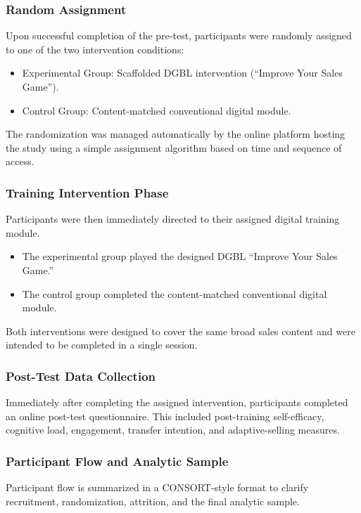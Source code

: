 \documentclass[12pt]{report}
\begin{document}
\subsubsection{Random Assignment}
Upon successful completion of the pre-test, participants were randomly assigned to one of the two intervention conditions:

\begin{itemize}[leftmargin=1.2cm]
    \item Experimental Group: Scaffolded DGBL intervention (``Improve Your Sales Game'').
    \item Control Group: Content-matched conventional digital module.
\end{itemize}

The randomization was managed automatically by the online platform hosting the study using a simple assignment algorithm based on time and sequence of access.

\subsubsection{Training Intervention Phase}
Participants were then immediately directed to their assigned digital training module.

\begin{itemize}[leftmargin=1.2cm]
    \item The experimental group played the designed DGBL ``Improve Your Sales Game.''
    \item The control group completed the content-matched conventional digital module.
\end{itemize}

Both interventions were designed to cover the same broad sales content and were intended to be completed in a single session.

\subsubsection{Post-Test Data Collection}
Immediately after completing the assigned intervention, participants completed an online post-test questionnaire. This included post-training self-efficacy, cognitive load, engagement, transfer intention, and adaptive-selling measures.

\subsubsection{Participant Flow and Analytic Sample}
Participant flow is summarized in a CONSORT-style format to clarify recruitment, randomization, attrition, and the final analytic sample.
\end{document}
